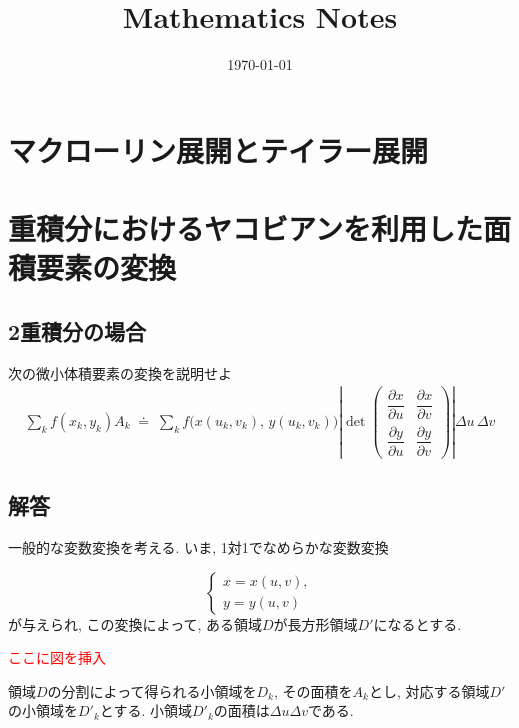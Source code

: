 \documentclass[a4paper,12pt]{jlreq}
\title{Mathematics Notes}
\author{}
\date{\today}
\begin{document}
\maketitle

\section*{マクローリン展開とテイラー展開}

\section*{重積分におけるヤコビアンを利用した面積要素の変換 \hfill }
\subsection*{2重積分の場合}

\begin{itembox}[l]{次の微小体積要素の変換を説明せよ}
\begin{align}
\sum_k f(x_k, y_k) A_k 
\;\doteq\;
\sum_k f\bigl(x(u_k, v_k),\, y(u_k, v_k)\bigr)
\left|
\det
\begin{pmatrix}
\dfrac{\partial x}{\partial u} & \dfrac{\partial x}{\partial v} \\[6pt]
\dfrac{\partial y}{\partial u} & \dfrac{\partial y}{\partial v}
\end{pmatrix}
\right|
\Delta u\, \Delta v
\end{align}
\end{itembox}

\subsection*{解答}
一般的な変数変換を考える. いま, 1対1でなめらかな変数変換

\begin{equation}
\begin{cases}
x = x(u, v), \\[4pt]
y = y(u, v)
\end{cases}
\end{equation}
が与えられ, この変換によって, ある領域$D$が長方形領域$D'$になるとする. 

\textcolor{red}{ここに図を挿入} \par

領域$D$の分割によって得られる小領域を$D_k$, その面積を$A_k$とし, 対応する領域$D'$の小領域を$D'_k$とする. 小領域$D'_k$の面積は$\Delta u \Delta v$である. \par
\end{document}

